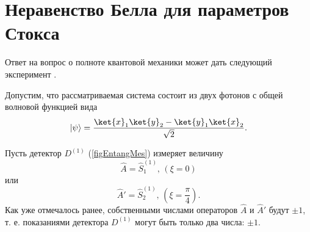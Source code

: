 \section{Неравенство Белла для параметров Стокса}
\label{pPart3EntangleBell}
Ответ на вопрос о полноте квантовой механики может дать следующий
эксперимент \cite{bBell, bPhisQuantInfo, PhysRevLett.28.938}.

Допустим, что рассматриваемая система состоит из двух фотонов с общей
волновой функцией вида
\begin{equation}
\left|\psi\right> = \frac{
\ket{x}_1\ket{y}_2 -
\ket{y}_1\ket{x}_2
}{\sqrt{2}}.
\label{eqBellInequalityState}
\end{equation}

Пусть детектор $D^{(1)}$ (\autoref{figEntangMes}) измеряет величину 
\[
\hat{A} = \hat{S}_1^{(1)}, \, (\xi = 0)
\] 
или
\[
\hat{A}' = \hat{S}_2^{(1)},\,(\xi =\frac{\pi}{4}).
\]
Как уже отмечалось ранее, собственными числами операторов $\hat{A}$ и
$\hat{A}'$ будут $\pm 1$, т. е. показаниями детектора $D^{(1)}$ могут
быть только два числа: $\pm 1$.

